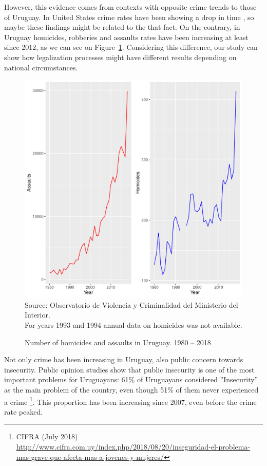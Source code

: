 \documentclass[11pt]{article}
\begin{document}
However, this evidence comes from contexts with opposite crime trends to those of Uruguay. In United States crime rates have been showing a drop in time \citep{gramlich5facts, james2018recent}, so maybe these findings might be related to the that fact. On the contrary, in Uruguay homicides, robberies and assaults rates have been increasing at least since 2012, as we can see on Figure~\ref{fig:homrap19802017}. Considering this difference, our study can show how legalization processes might have different results depending on national circumstances.

\begin{figure}[H]
	\centering
	\caption{Number of homicides and assaults in Uruguay. 1980 -- 2018}
	\label{fig:homrap19802017}
	\includegraphics[width=.7\textwidth]{evo_delitos.pdf}
	\\
    \scriptsize{Source: Observatorio de Violencia y Criminalidad del Ministerio del Interior. \\ For years 1993 and 1994 annual data on homicides was not available.}
\end{figure}

Not only crime has been increasing in Uruguay, also public concern towards insecurity. Public opinion studies show that public insecurity is one of the most important problems for Uruguayans: 61\% of Uruguayans considered ''Insecurity'' as the main problem of the country, even though 51\% of them never experienced a crime \footnote{CIFRA (July 2018) \url{http://www.cifra.com.uy/index.php/2018/08/20/inseguridad-el-problema-mas-grave-que-afecta-mas-a-jovenes-y-mujeres/}}. This proportion has been increasing since 2007, even before the crime rate peaked.
\end{document}
